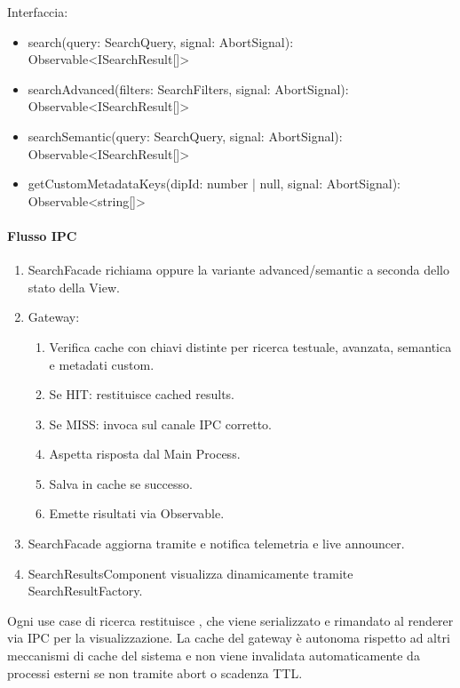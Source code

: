 Interfaccia:
\begin{itemize}
    \item search(query: SearchQuery, signal: AbortSignal): Observable<ISearchResult[]>
    \item searchAdvanced(filters: SearchFilters, signal: AbortSignal):\\
    Observable<ISearchResult[]>
    \item searchSemantic(query: SearchQuery, signal: AbortSignal):\\
    Observable<ISearchResult[]>
    \item getCustomMetadataKeys(dipId: number | null, signal: AbortSignal): Observable<string[]>
\end{itemize}

\paragraph{Flusso IPC}
\begin{enumerate}
    \item SearchFacade richiama  oppure la variante advanced/semantic a seconda dello stato della View.
    \item Gateway:
    \begin{enumerate}
        \item Verifica cache con chiavi distinte per ricerca testuale, avanzata, semantica e metadati custom.
        \item Se HIT: restituisce cached results.
        \item Se MISS: invoca  sul canale IPC corretto.
        \item Aspetta risposta dal Main Process.
        \item Salva in cache se successo.
        \item Emette risultati via Observable.
    \end{enumerate}
    \item SearchFacade aggiorna  tramite  e notifica telemetria e live announcer.
    \item SearchResultsComponent visualizza dinamicamente tramite SearchResultFactory.
\end{enumerate}
Ogni use case di ricerca restituisce , che viene serializzato e rimandato al renderer via IPC per la visualizzazione. La cache del gateway è autonoma rispetto ad altri meccanismi di cache del sistema e non viene invalidata automaticamente da processi esterni se non tramite abort o scadenza TTL.

